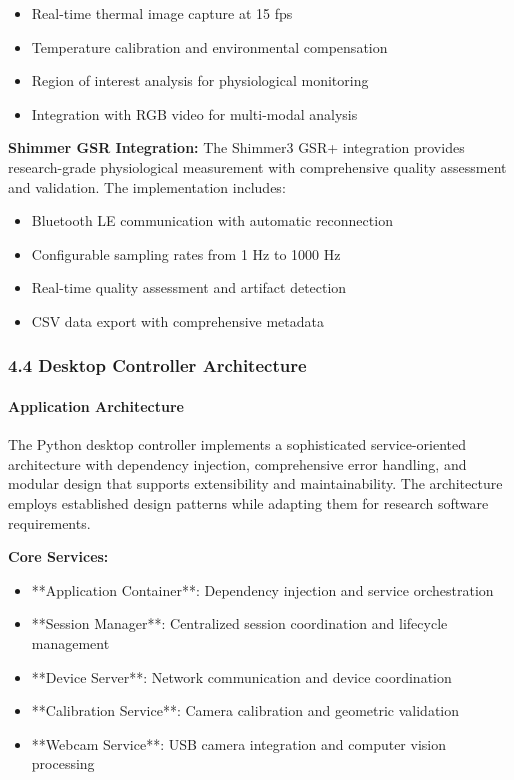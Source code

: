 \documentclass[12pt,a4paper]{report}
\begin{document}
\begin{itemize}
\item Real-time thermal image capture at 15 fps
\item Temperature calibration and environmental compensation
\item Region of interest analysis for physiological monitoring
\item Integration with RGB video for multi-modal analysis

\end{itemize}
\textbf{Shimmer GSR Integration:}
The Shimmer3 GSR+ integration provides research-grade physiological measurement with comprehensive quality assessment
and validation. The implementation includes:

\begin{itemize}
\item Bluetooth LE communication with automatic reconnection
\item Configurable sampling rates from 1 Hz to 1000 Hz
\item Real-time quality assessment and artifact detection
\item CSV data export with comprehensive metadata

\end{itemize}
\subsubsection{4.4 Desktop Controller Architecture}

\paragraph{Application Architecture}

The Python desktop controller implements a sophisticated service-oriented architecture with dependency injection,
comprehensive error handling, and modular design that supports extensibility and maintainability. The architecture
employs established design patterns while adapting them for research software requirements.

\textbf{Core Services:}

\begin{itemize}
\item **Application Container**: Dependency injection and service orchestration
\item **Session Manager**: Centralized session coordination and lifecycle management
\item **Device Server**: Network communication and device coordination
\item **Calibration Service**: Camera calibration and geometric validation
\item **Webcam Service**: USB camera integration and computer vision processing

\end{itemize}
\end{document}

